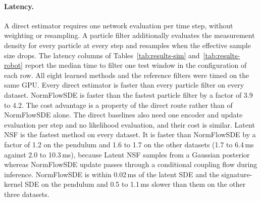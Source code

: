 \paragraph{Latency.}
A direct estimator requires one network evaluation per time step, without weighting or resampling. A particle filter additionally evaluates the measurement density for every particle at every step and resamples when the effective sample size drops. The latency columns of Tables~\ref{tab:results-sim} and~\ref{tab:results-robot} report the median time to filter one test window in the configuration of each row. All eight learned methods and the reference filters were timed on the same GPU. Every direct estimator is faster than every particle filter on every dataset. NormFlowSDE is faster than the fastest particle filter by a factor of 3.9 to 4.2. The cost advantage is a property of the direct route rather than of NormFlowSDE alone. The direct baselines also need one encoder and update evaluation per step and no likelihood evaluation, and their cost is similar. Latent NSF is the fastest method on every dataset. It is faster than NormFlowSDE by a factor of 1.2 on the pendulum and 1.6 to 1.7 on the other datasets (1.7 to 6.4\,ms against 2.0 to 10.3\,ms), because Latent NSF samples from a Gaussian posterior whereas NormFlowSDE update passes through a conditional coupling flow during inference. NormFlowSDE is within 0.02\,ms of the latent SDE and the signature-kernel SDE on the pendulum and 0.5 to 1.1\,ms slower than them on the other three datasets.